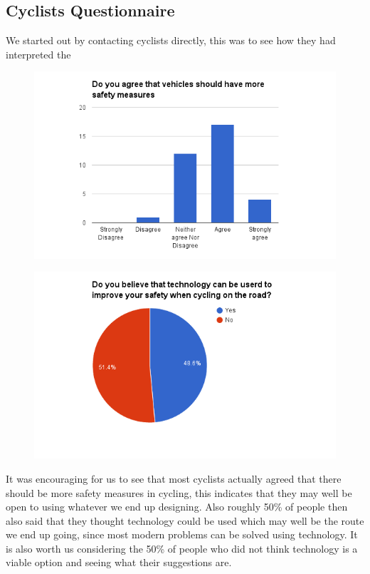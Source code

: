 \documentclass[a4paper]{report}
\begin{document}
{\subsection{Cyclists Questionnaire}
We started out by contacting cyclists directly, this was to see how they had interpreted the 
\begin{figure}[H]
\centering
\includegraphics[scale=0.6]{figures/research_report/questionnaires/drivers_1}
\end{figure}
\begin{figure}[H]
\centering
\includegraphics[scale=0.6]{figures/research_report/questionnaires/drivers_2}
\end{figure}
It was encouraging for us to see that most cyclists actually agreed that there should be more safety measures in cycling, this indicates that they may well be open to using whatever we end up designing. Also roughly 50\% of people then also said that they thought technology could be used which may well be the route we end up going, since most modern problems can be solved using technology. It is also worth us considering the 50\% of people who did not think technology is a viable option and seeing what their suggestions are.
}
\end{document}
